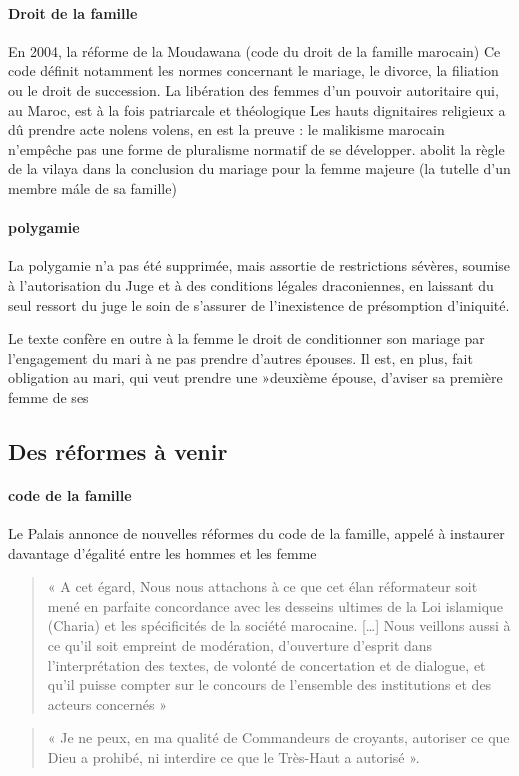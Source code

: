 \paragraph{Droit de la famille}
  En 2004, la réforme de la Moudawana (code du droit de la famille 
  marocain)
 Ce code définit notamment les normes concernant le mariage, le divorce, la filiation ou le droit de succession.
La libération des femmes d'un pouvoir autoritaire qui, au Maroc, est à la fois patriarcale et théologique   Les hauts dignitaires religieux a dû prendre acte nolens volens, en est la preuve : le malikisme marocain n'empêche pas une forme de pluralisme normatif de se développer.
  abolit la règle de la vilaya dans la conclusion du mariage pour la femme majeure (la tutelle d'un membre mále de sa famille)  
  
  \paragraph{polygamie} La polygamie n'a pas été supprimée, mais assortie de restrictions sévères, soumise à l'autorisation du Juge et à des conditions légales draconiennes, en laissant du seul ressort du juge le soin de s'assurer de l'inexistence de présomption d'iniquité.
  
 Le texte confère en outre à la femme le droit de conditionner son mariage par l'engagement du mari à ne pas prendre d'autres épouses. Il est, en plus, fait obligation au mari, qui veut prendre une »deuxième épouse, d'aviser sa première femme de ses

\subsection{Des réformes à venir}

\paragraph{code de la famille}
Le Palais annonce de nouvelles réformes du code de la famille, appelé à instaurer davantage d'égalité entre les hommes et les femme
\begin{quote}
    « A cet égard, Nous nous attachons à ce que cet élan réformateur soit mené en parfaite concordance avec les desseins ultimes de la Loi islamique (Charia) et les spécificités de la société marocaine.
    [\ldots]
    Nous veillons aussi à ce qu'il soit empreint de modération, d'ouverture d'esprit dans l'interprétation des textes, de volonté de concertation et de dialogue, et qu'il puisse compter sur le concours de l'ensemble des institutions et des acteurs concernés »
\end{quote}
\begin{quote}
    « Je ne peux, en ma qualité de Commandeurs de croyants, autoriser ce que Dieu a prohibé, ni interdire ce que le Très-Haut a autorisé ».
\end{quote}
 
